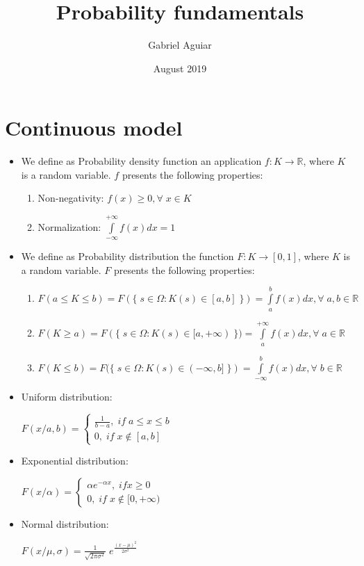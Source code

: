 \documentclass{article}
\title{Probability fundamentals}
\author{Gabriel Aguiar}
\date{August 2019}
\begin{document}
\maketitle

\section{Continuous model}

\begin{itemize}

\item We define as Probability density function an application $f: K \rightarrow \mathbb{R}$, where $K$ is a random variable. $f$ presents the following properties:

\begin{enumerate}

\item Non-negativity: $f(x) \geq 0, \forall \; x \in K$

\item Normalization: $\int\limits_{-\infty}^{+\infty} f(x) dx = 1$

\end{enumerate}

\item We define as Probability distribution the function $F: K \rightarrow [0,1]$, where $K$ is a random variable. $F$ presents the following properties:

\begin{enumerate}

\item $F(a \leq K \leq b) = F(\{ \; s \in \Omega: K(s) \in [a,b] \; \}) = \int\limits_{a}^{b} f(x) dx, \forall \; a,b \in \mathbb{R}$

\item $F(K \geq a) = F(\{ \; s \in \Omega: K(s) \in [a,+\infty) \; \}) = \int\limits_{a}^{+\infty} f(x) dx, \forall \; a \in \mathbb{R}$

\item $F(K \leq b) = F(\{ \; s \in \Omega: K(s) \in (-\infty,b] \; \}) = \int\limits_{-\infty}^{b} f(x) dx, \forall \; b \in \mathbb{R}$

\end{enumerate}

\item Uniform distribution:

$F(x/a,b) = \begin{cases} \frac{1}{b - a}, \; if \; a \leq x \leq b \\ 0, \; if \; x \notin [a,b] \end{cases}$

\item Exponential distribution:

$F(x/\alpha) = \begin{cases} \alpha e^{-\alpha x}, \; if x \geq 0 \\ 0, \; if \; x \notin [0,+\infty) \end{cases}$

\item Normal distribution:

$F(x/\mu,\sigma) = \frac{1}{\sqrt{2 \pi \sigma^{2}}} \; e^{\frac{(x - \mu)^{2}}{2 \sigma^{2}}}$
        
\end{itemize}
\end{document}
